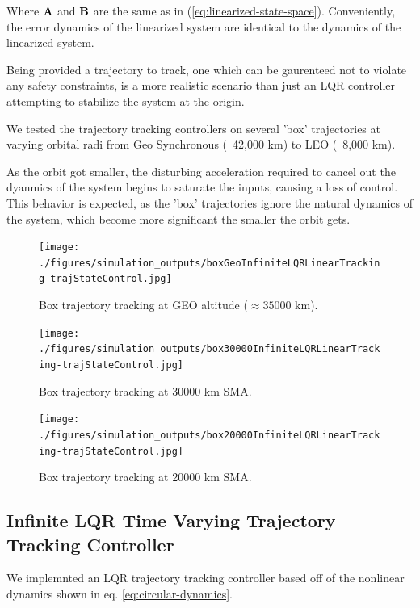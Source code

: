 \documentclass[conference]{IEEEtran}
\begin{document}
Where ${\bf A}$ and ${\bf B}$ are the same as in
(\ref{eq:linearized-state-space}). Conveniently, the error dynamics of the
linearized system are identical to the dynamics of the linearized system.

Being provided a trajectory to track, one which can be gaurenteed not to
violate any safety constraints, is a more realistic scenario than just an LQR
controller attempting to stabilize the system at the origin.

We tested the trajectory tracking controllers on several 'box' trajectories at
varying orbital radi from Geo Synchronous (~42,000 km) to LEO (~8,000 km).

As the orbit got smaller, the disturbing acceleration required to cancel out
the dyanmics of the system begins to saturate the inputs, causing a loss of
control. This behavior is expected, as the 'box' trajectories ignore the
natural dynamics of the system, which become more significant the smaller the
orbit gets.

\begin{figure}[t]
    \centerline{\texttt{[image: ./figures/simulation\_outputs/boxGeoInfiniteLQRLinearTracking-trajStateControl.jpg]}}
    \caption{Box trajectory tracking at GEO altitude ($\approx 35000$ km).}
    \label{fig:boxGEO}
\end{figure}

\begin{figure}[t]
    \centerline{\texttt{[image: ./figures/simulation\_outputs/box30000InfiniteLQRLinearTracking-trajStateControl.jpg]}}
    \caption{Box trajectory tracking at 30000 km SMA.}
    \label{fig:box30000}
\end{figure}

\begin{figure}[t]
    \centerline{\texttt{[image: ./figures/simulation\_outputs/box20000InfiniteLQRLinearTracking-trajStateControl.jpg]}}
    \caption{Box trajectory tracking at 20000 km SMA.}
    \label{fig:box2000}
\end{figure}


\subsection{Infinite LQR Time Varying Trajectory Tracking Controller}

We implemnted an LQR trajectory tracking controller based off of the nonlinear
dynamics shown in eq. \ref{eq:circular-dynamics}.
\end{document}
